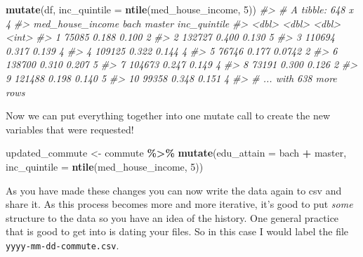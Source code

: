 \documentclass[
]{book}
\newenvironment{Shaded}{\begin{snugshade}}{\end{snugshade}}
\newcommand{\CommentTok}[1]{\textcolor[rgb]{0.56,0.35,0.01}{\textit{#1}}}
\newcommand{\DataTypeTok}[1]{\textcolor[rgb]{0.13,0.29,0.53}{#1}}
\newcommand{\DecValTok}[1]{\textcolor[rgb]{0.00,0.00,0.81}{#1}}
\newcommand{\KeywordTok}[1]{\textcolor[rgb]{0.13,0.29,0.53}{\textbf{#1}}}
\newcommand{\NormalTok}[1]{#1}
\newcommand{\OperatorTok}[1]{\textcolor[rgb]{0.81,0.36,0.00}{\textbf{#1}}}
\newcommand{\StringTok}[1]{\textcolor[rgb]{0.31,0.60,0.02}{#1}}
\begin{document}
\begin{Shaded}
\begin{Highlighting}[]
\KeywordTok{mutate}\NormalTok{(df, }\DataTypeTok{inc\_quintile =} \KeywordTok{ntile}\NormalTok{(med\_house\_income, }\DecValTok{5}\NormalTok{))}
\CommentTok{\#\textgreater{} \# A tibble: 648 x 4}
\CommentTok{\#\textgreater{}    med\_house\_income  bach master inc\_quintile}
\CommentTok{\#\textgreater{}               \textless{}dbl\textgreater{} \textless{}dbl\textgreater{}  \textless{}dbl\textgreater{}        \textless{}int\textgreater{}}
\CommentTok{\#\textgreater{}  1            75085 0.188 0.100             2}
\CommentTok{\#\textgreater{}  2           132727 0.400 0.130             5}
\CommentTok{\#\textgreater{}  3           110694 0.317 0.139             4}
\CommentTok{\#\textgreater{}  4           109125 0.322 0.144             4}
\CommentTok{\#\textgreater{}  5            76746 0.177 0.0742            2}
\CommentTok{\#\textgreater{}  6           138700 0.310 0.207             5}
\CommentTok{\#\textgreater{}  7           104673 0.247 0.149             4}
\CommentTok{\#\textgreater{}  8            73191 0.300 0.126             2}
\CommentTok{\#\textgreater{}  9           121488 0.198 0.140             5}
\CommentTok{\#\textgreater{} 10            99358 0.348 0.151             4}
\CommentTok{\#\textgreater{} \# ... with 638 more rows}
\end{Highlighting}
\end{Shaded}

Now we can put everything together into one mutate call to create the new variables that were requested!

\begin{Shaded}
\begin{Highlighting}[]
\NormalTok{updated\_commute \textless{}{-}}\StringTok{ }\NormalTok{commute }\OperatorTok{\%\textgreater{}\%}\StringTok{ }
\StringTok{  }\KeywordTok{mutate}\NormalTok{(}\DataTypeTok{edu\_attain =}\NormalTok{ bach }\OperatorTok{+}\StringTok{ }\NormalTok{master, }
         \DataTypeTok{inc\_quintile =} \KeywordTok{ntile}\NormalTok{(med\_house\_income, }\DecValTok{5}\NormalTok{))}
\end{Highlighting}
\end{Shaded}

As you have made these changes you can now write the data again to csv and share it. As this process becomes more and more iterative, it's good to put \emph{some} structure to the data so you have an idea of the history. One general practice that is good to get into is dating your files. So in this case I would label the file \texttt{yyyy-mm-dd-commute.csv}.
\end{document}
